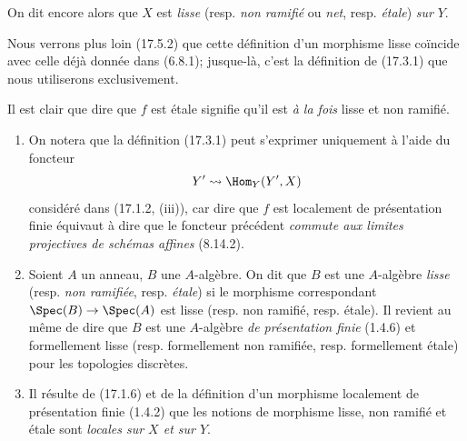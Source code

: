 On dit encore alors que $X$ est \emph{lisse} (resp. \emph{non ramifié} ou \emph{net}, resp. \emph{étale}) \emph{sur} $Y$.

Nous verrons plus loin (17.5.2) que cette définition d'un morphisme lisse coïncide avec celle déjà donnée dans (6.8.1); jusque-là, c'est la définition de (17.3.1) que nous utiliserons exclusivement.

Il est clair que dire que $f$ est étale signifie qu'il est \emph{à la fois} lisse et non ramifié.

\begin{remarks}[17.3.2]
\begin{enumerate}
  \item[(i)] On notera que la définition (17.3.1) peut s'exprimer uniquement à l'aide du foncteur
  \[
    Y'\leadsto\Hom_Y(Y',X)
  \]
  considéré dans (17.1.2, (iii)), car dire que $f$ est localement de présentation finie équivaut à dire que le foncteur précédent \emph{commute aux limites projectives de schémas affines} (8.14.2).
  \item[(ii)] Soient $A$ un anneau, $B$ une $A$-algèbre. On dit que $B$ est une $A$-algèbre \emph{lisse} (resp. \emph{non ramifiée}, resp. \emph{étale}) si le morphisme correspondant $\Spec(B)\to\Spec(A)$ est lisse (resp. non ramifié, resp. étale). Il revient au même de dire que $B$ est une $A$-algèbre \emph{de présentation finie} (1.4.6) et formellement lisse (resp. formellement non ramifiée, resp. formellement étale) pour les topologies discrètes.
  \item[(iii)] Il résulte de (17.1.6) et de la définition d'un morphisme localement de présentation finie (1.4.2) que les notions de morphisme lisse, non ramifié et étale sont \emph{locales sur $X$ et sur $Y$}.
\end{enumerate}
\end{remarks}

